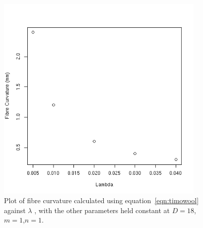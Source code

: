 %

\begin{figure}[!h]
  \centering
  \includegraphics[width=0.9\textwidth]{curvlambda.png}
  \caption{Plot of fibre curvature calculated using equation~\ref{eqn:timowool} against $\lambda$ , with the other parameters held constant at $D=18$, $m=1$,$n=1$.}
  \label{fig:curvlambda}
\end{figure}

%

